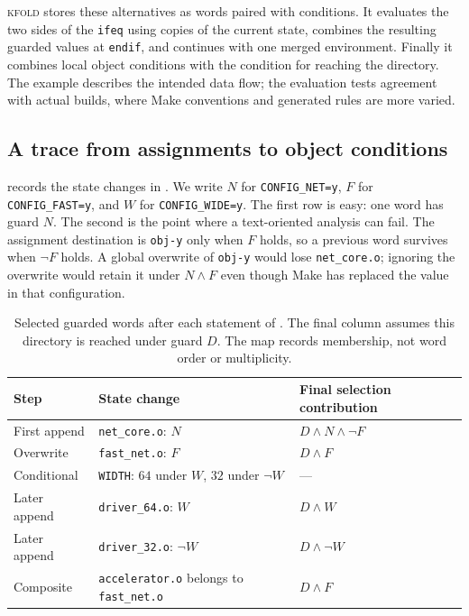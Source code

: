 \documentclass[acmsmall,screen,review]{acmart}
\newcommand{\tool}{\textsc{kfold}\xspace}
\begin{document}
\tool stores these alternatives as words paired with conditions. It evaluates the two sides of the \texttt{ifeq} using copies of the current state, combines the resulting guarded values at \texttt{endif}, and continues with one merged environment. Finally it combines local object conditions with the condition for reaching the directory. The example describes the intended data flow; the evaluation tests agreement with actual builds, where Make conventions and generated rules are more varied.


\subsection{A trace from assignments to object conditions}
\label{sec:overview:trace}
 records the state changes in . We write $N$ for \texttt{CONFIG\_NET=y}, $F$ for \texttt{CONFIG\_FAST=y}, and $W$ for \texttt{CONFIG\_WIDE=y}. The first row is easy: one word has guard $N$. The second is the point where a text-oriented analysis can fail. The assignment destination is \texttt{obj-y} only when $F$ holds, so a previous word survives when $\neg F$ holds. A global overwrite of \texttt{obj-y} would lose \texttt{net\_core.o}; ignoring the overwrite would retain it under $N\land F$ even though Make has replaced the value in that configuration.

\begin{table}[t]
\centering\footnotesize
\caption{Selected guarded words after each statement of . The final column assumes this directory is reached under guard $D$. The map records membership, not word order or multiplicity.}
\label{tab:example-trace}
\begin{tabular}{lll}
\toprule
Step & State change & Final selection contribution \\
\midrule
First append & \texttt{net\_core.o}: $N$ & $D\land N\land\neg F$ \\
Overwrite & \texttt{fast\_net.o}: $F$ & $D\land F$ \\
Conditional & \texttt{WIDTH}: $64$ under $W$, $32$ under $\neg W$ & --- \\
Later append & \texttt{driver\_64.o}: $W$ & $D\land W$ \\
Later append & \texttt{driver\_32.o}: $\neg W$ & $D\land\neg W$ \\
Composite & \texttt{accelerator.o} belongs to \texttt{fast\_net.o} & $D\land F$ \\
\bottomrule
\end{tabular}
\end{table}
\end{document}
